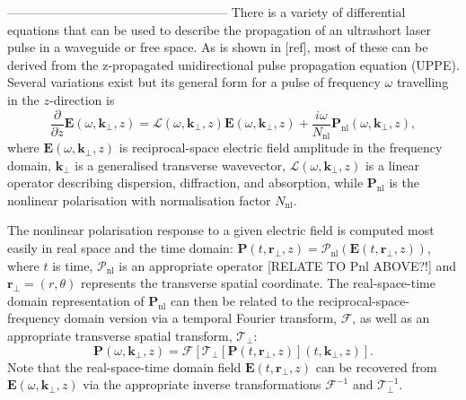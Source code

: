 \documentclass[a4paper]{jpconf}
\begin{document}
-----------------------------------------------------
There is a variety of differential equations that can be used to describe the propagation of an ultrashort laser pulse in a waveguide or free space. As is shown in [ref], most of these can be derived from the z-propagated unidirectional pulse propagation equation (UPPE). Several variations exist but its general form for a pulse of frequency $\omega$ travelling in the $z$-direction is 
\begin{equation}
\frac{\partial}{\partial z} \mathbf{E}(\omega, \mathbf{k}_\perp, z)= \mathcal{L}(\omega, \mathbf{k}_\perp, z)\mathbf{E}(\omega, \mathbf{k}_\perp, z) + \frac{i \omega}{N_{\text{nl}}} \mathbf{P}_\text{nl}(\omega, \mathbf{k}_\perp, z),
\end{equation}
where $\mathbf{E}(\omega, \mathbf{k}_\perp, z)$ is reciprocal-space electric field amplitude in the frequency domain, $\mathbf{k}_\perp$ is a generalised transverse wavevector,  $\mathcal{L}(\omega, \mathbf{k}_\perp, z)$ is a linear operator describing dispersion, diffraction, and absorption, while $\mathbf{P}_\text{nl}$ is the nonlinear polarisation with normalisation factor $N_\text{nl}$. \par 
The nonlinear polarisation response to a given electric field is computed most easily in real space and the time domain: $\mathbf{P}(t, \mathbf{r}_\perp,z) = \mathcal{P}_\text{nl}(\mathbf{E}(t,\mathbf{r}_\perp,z))$, where $t$ is time, $\mathcal{P}_\text{nl}$ is an appropriate operator [RELATE TO Pnl ABOVE?!] and $\mathbf{r}_\perp = (r, \theta)$ represents the transverse spatial coordinate. The real-space-time domain representation of $\mathbf{P}_\text{nl}$ can then be related to the reciprocal-space-frequency domain version via a temporal Fourier transform, $\mathcal{F}$, as well as an appropriate transverse spatial transform, $\mathcal{T}_\perp$:
\begin{equation}
\mathbf{P}(\omega, \mathbf{k}_\perp,z) = \mathcal{F}\left[ \mathcal{T}_\perp \left[ \mathbf{P}(t, \mathbf{r}_\perp,z) \right](t, \mathbf{k}_\perp, z)  \right]. 
\end{equation}
Note that the real-space-time domain field $\mathbf{E}(t, \mathbf{r}_\perp, z)$ can be recovered from $\mathbf{E}(\omega, \mathbf{k}_\perp, z)$ via the appropriate inverse transformations $\mathcal{F}^{-1}$ and $\mathcal{T}^{-1}_\perp$. \par 
\end{document}
